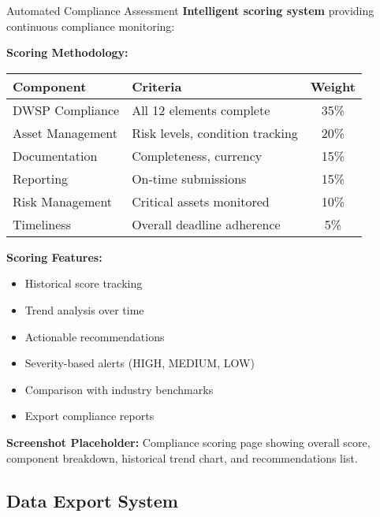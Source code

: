 \documentclass[11pt,a4paper]{article}
\begin{document}
\begin{featurebox}{Automated Compliance Assessment}
    \textbf{Intelligent scoring system} providing continuous compliance monitoring:

    \vspace{0.5cm}
    \textbf{Scoring Methodology:}
    \begin{table}[H]
    \centering
    \begin{tabular}{llc}
    \toprule
    \textbf{Component} & \textbf{Criteria} & \textbf{Weight} \\
    \midrule
    DWSP Compliance & All 12 elements complete & 35\% \\
    Asset Management & Risk levels, condition tracking & 20\% \\
    Documentation & Completeness, currency & 15\% \\
    Reporting & On-time submissions & 15\% \\
    Risk Management & Critical assets monitored & 10\% \\
    Timeliness & Overall deadline adherence & 5\% \\
    \bottomrule
    \end{tabular}
    \end{table}

    \vspace{0.5cm}
    \textbf{Scoring Features:}
    \begin{itemize}[itemsep=0.2em]
        \item Historical score tracking
        \item Trend analysis over time
        \item Actionable recommendations
        \item Severity-based alerts (HIGH, MEDIUM, LOW)
        \item Comparison with industry benchmarks
        \item Export compliance reports
    \end{itemize}
\end{featurebox}

\vspace{0.5cm}

\textbf{Screenshot Placeholder:} Compliance scoring page showing overall score, component breakdown, historical trend chart, and recommendations list.

\newpage

\subsection{Data Export System}
\end{document}
